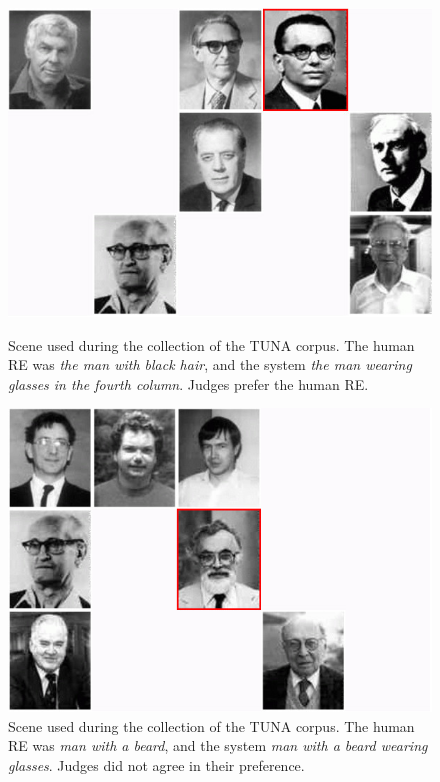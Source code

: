 \begin{figure}[h]
\begin{minipage}{0.48\linewidth}
\centering
\includegraphics[width=\textwidth]{images/s59t26.jpg}
\caption{Scene used during the collection of the TUNA corpus. The human  RE was \emph{the man with black hair}, and the system \emph{the man wearing glasses in the fourth column}. Judges prefer the human RE.}
\label{s28t25}
\end{minipage}
\hspace*{.04cm}
\begin{minipage}{0.48\linewidth}
\centering
\includegraphics[width=\textwidth]{images/s315t21.jpg}
\vspace*{-.3cm}
\caption{Scene used during the collection of the TUNA corpus. The human RE was \emph{man with a beard}, and the system \emph{man with a beard wearing glasses}. Judges did not agree in their preference.}
\label{s307t21}
\end{minipage}
\end{figure}

